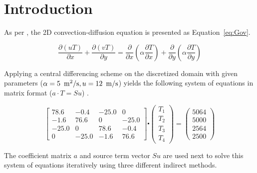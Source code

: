 
\chapter{Introduction}
\label{chap:intro}

As per \cite{assign}, the 2D convection-diffusion equation is presented as Equation~\ref{eq:Gov}.

\begin{equation}
	\label{eq:Gov}	
	\frac{\partial(uT)}{\partial x} + \frac{\partial(vT)}{\partial y}= \frac{\partial}{\partial x} \left( \alpha \frac{\partial T}{\partial x} \right) + \frac{\partial}{\partial y} \left( \alpha \frac{\partial T}{\partial y} \right)
\end{equation}

Applying a central differencing scheme on the discretized domain with given parameters ($\alpha = 5\ \,\mathrm{m^2/s}, u=12\ \,\mathrm{m/s}$) yields the following system of equations in matrix format ($a \cdot T = Su$) \cite{assign}.

\begin{equation*}
	\begin{bmatrix}
		78.6	&	-0.4	&	-25.0 	&	0		\\
		-1.6	&	76.6 	&	0  		&	-25.0	\\
		-25.0	&	0   	&	78.6	&	-0.4	\\
		0  		&	-25.0	&	-1.6	&	76.6
	\end{bmatrix}
	\centerdot 
	\begin{pmatrix} T_1	\\	T_2	\\	T_3	\\ T_4	\end{pmatrix}
	=
	\begin{pmatrix} 5064	\\	5000	\\	2564	\\ 2500 \end{pmatrix}	
\end{equation*}

The coefficient matrix $a$ and source term vector $Su$ are used next to solve this system of equations iteratively using three different indirect methods. \\

